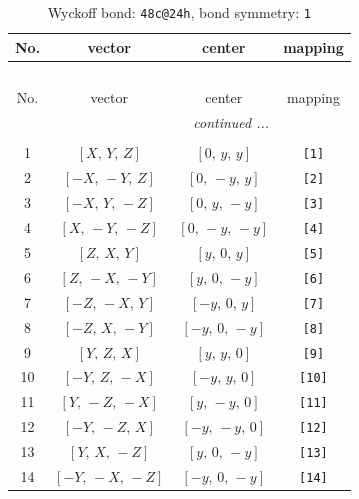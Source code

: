 \documentclass[fleqn,8pt]{jsarticle}
\begin{document}
\begin{longtable}{cccc}
\caption{Wyckoff bond: {\tt 48c@24h}, bond symmetry: {\tt 1}}
 \\
 \hline \hline
No. & vector & center & mapping \\ \hline \endfirsthead

\multicolumn{3}{l}{\tablename\ \thetable{}} \\
 \hline \hline
No. & vector & center & mapping \\ \hline \endhead

 \hline \hline
\multicolumn{3}{r}{\footnotesize\it continued ...} \\ \endfoot

 \hline \hline
\multicolumn{3}{r}{} \\ \endlastfoot

1 & $\left[ X,\, Y,\, Z \right]$ & $\left[ 0,\, y,\, y \right]$ & {\tt [1]} \\ \hline
2 & $\left[ - X,\, - Y,\, Z \right]$ & $\left[ 0,\, - y,\, y \right]$ & {\tt [2]} \\ \hline
3 & $\left[ - X,\, Y,\, - Z \right]$ & $\left[ 0,\, y,\, - y \right]$ & {\tt [3]} \\ \hline
4 & $\left[ X,\, - Y,\, - Z \right]$ & $\left[ 0,\, - y,\, - y \right]$ & {\tt [4]} \\ \hline
5 & $\left[ Z,\, X,\, Y \right]$ & $\left[ y,\, 0,\, y \right]$ & {\tt [5]} \\ \hline
6 & $\left[ Z,\, - X,\, - Y \right]$ & $\left[ y,\, 0,\, - y \right]$ & {\tt [6]} \\ \hline
7 & $\left[ - Z,\, - X,\, Y \right]$ & $\left[ - y,\, 0,\, y \right]$ & {\tt [7]} \\ \hline
8 & $\left[ - Z,\, X,\, - Y \right]$ & $\left[ - y,\, 0,\, - y \right]$ & {\tt [8]} \\ \hline
9 & $\left[ Y,\, Z,\, X \right]$ & $\left[ y,\, y,\, 0 \right]$ & {\tt [9]} \\ \hline
10 & $\left[ - Y,\, Z,\, - X \right]$ & $\left[ - y,\, y,\, 0 \right]$ & {\tt [10]} \\ \hline
11 & $\left[ Y,\, - Z,\, - X \right]$ & $\left[ y,\, - y,\, 0 \right]$ & {\tt [11]} \\ \hline
12 & $\left[ - Y,\, - Z,\, X \right]$ & $\left[ - y,\, - y,\, 0 \right]$ & {\tt [12]} \\ \hline
13 & $\left[ Y,\, X,\, - Z \right]$ & $\left[ y,\, 0,\, - y \right]$ & {\tt [13]} \\ \hline
14 & $\left[ - Y,\, - X,\, - Z \right]$ & $\left[ - y,\, 0,\, - y \right]$ & {\tt [14]} \\ \hline

\end{longtable}
\end{document}

